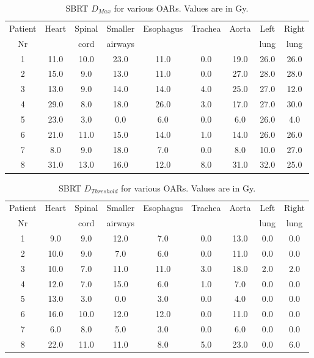 \begin{table}[H]
  \centering
  \caption{SBRT $D_{Max}$ for various OARs. Values are in Gy.}
  \begin{tabular}{c|c|c|c|c|c|c|c|c}
   Patient & \multirow{2}{*}{Heart} & Spinal  & Smaller  & \multirow{2}{*}{Esophagus} & \multirow{2}{*}{Trachea} & \multirow{2}{*}{Aorta} & Left  & Right \\
   Nr & & cord & airways & & & & lung & lung \\
 \hline\hline 
1 & 11.0 & 10.0 & 23.0 & 11.0 & 0.0 & 19.0 & 26.0 & 26.0 \\ 
2 & 15.0 & 9.0 & 13.0 & 11.0 & 0.0 & 27.0 & 28.0 & 28.0 \\ 
3 & 13.0 & 9.0 & 14.0 & 14.0 & 4.0 & 25.0 & 27.0 & 12.0 \\ 
4 & 29.0 & 8.0 & 18.0 & 26.0 & 3.0 & 17.0 & 27.0 & 30.0 \\ 
5 & 23.0 & 3.0 & 0.0 & 6.0 & 0.0 & 6.0 & 26.0 & 4.0 \\ 
6 & 21.0 & 11.0 & 15.0 & 14.0 & 1.0 & 14.0 & 26.0 & 26.0 \\ 
7 & 8.0 & 9.0 & 18.0 & 7.0 & 0.0 & 8.0 & 10.0 & 27.0 \\ 
8 & 31.0 & 13.0 & 16.0 & 12.0 & 8.0 & 31.0 & 32.0 & 25.0 \\ 
\hline\hline
  \end{tabular}
  \label{tab:oarlimits1}
\end{table}

\begin{table}[H]
  \centering
  \caption{SBRT $D_{Threshold}$ for various OARs. Values are in Gy.}
  \begin{tabular}{c|c|c|c|c|c|c|c|c}
   Patient & \multirow{2}{*}{Heart} & Spinal  & Smaller  & \multirow{2}{*}{Esophagus} & \multirow{2}{*}{Trachea} & \multirow{2}{*}{Aorta} & Left  & Right \\
   Nr & & cord & airways & & & & lung & lung \\
 \hline\hline 
1 & 9.0 & 9.0 & 12.0 & 7.0 & 0.0 & 13.0 & 0.0 & 0.0 \\ 
2 & 10.0 & 9.0 & 7.0 & 6.0 & 0.0 & 11.0 & 0.0 & 0.0 \\ 
3 & 10.0 & 7.0 & 11.0 & 11.0 & 3.0 & 18.0 & 2.0 & 2.0 \\ 
4 & 12.0 & 7.0 & 15.0 & 6.0 & 1.0 & 7.0 & 0.0 & 0.0 \\ 
5 & 13.0 & 3.0 & 0.0 & 3.0 & 0.0 & 4.0 & 0.0 & 0.0 \\ 
6 & 16.0 & 10.0 & 12.0 & 12.0 & 0.0 & 11.0 & 0.0 & 0.0 \\ 
7 & 6.0 & 8.0 & 5.0 & 3.0 & 0.0 & 6.0 & 0.0 & 0.0 \\ 
8 & 22.0 & 11.0 & 11.0 & 8.0 & 5.0 & 23.0 & 0.0 & 6.0 \\

\hline\hline
  \end{tabular}
  \label{tab:oarlimits1}
\end{table}

